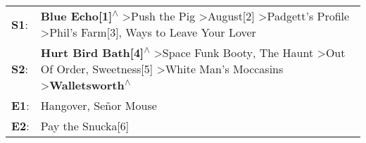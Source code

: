 \begin{supertabular}{p{0.03\textwidth}p{0.92\textwidth}}
 \textbf{S1}:  &                                                        \textbf{Blue Echo[1]\textsuperscript{$\wedge$}} \textgreater \enspace Push the Pig\textsuperscript{} \textgreater \enspace August[2]\textsuperscript{} \textgreater \enspace Padgett's Profile\textsuperscript{} \textgreater \enspace Phil's Farm[3]\textsuperscript{},  Ways to Leave Your Lover\textsuperscript{}  \enspace  \\
 \textbf{S2}:  &  \textbf{Hurt Bird Bath[4]\textsuperscript{$\wedge$}} \textgreater \enspace Space Funk Booty\textsuperscript{}, \enspace The Haunt\textsuperscript{} \textgreater \enspace Out Of Order\textsuperscript{}, \enspace Sweetness[5]\textsuperscript{} \textgreater \enspace White Man's Moccasins\textsuperscript{} \textgreater \enspace \textbf{Walletsworth\textsuperscript{$\wedge$}}  \enspace  \\
 \textbf{E1}:  &                                                                                                                                                                                                                                                                                                                     Hangover\textsuperscript{}, \enspace Señor Mouse\textsuperscript{}  \enspace  \\
 \textbf{E2}:  &                                                                                                                                                                                                                                                                                                                                                    Pay the Snucka[6]\textsuperscript{}  \enspace  \\
\end{supertabular}
